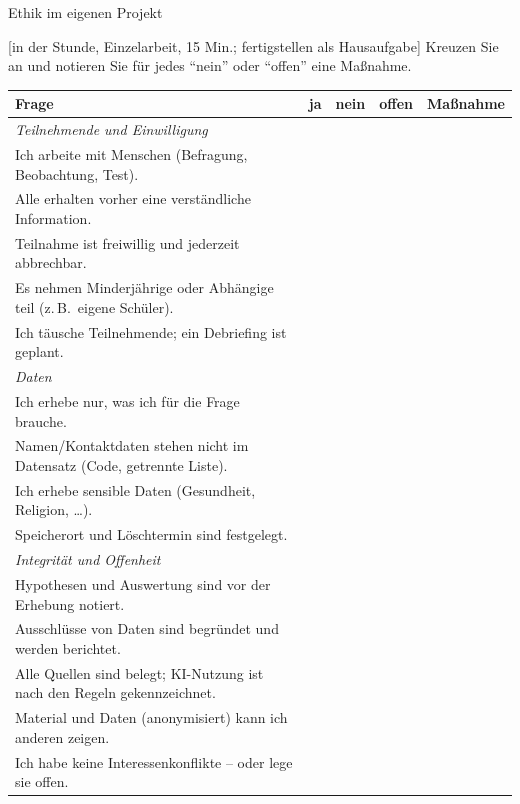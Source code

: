 \begin{uebungsblatt}{Ethik im eigenen Projekt}

[in der Stunde, Einzelarbeit, 15 Min.; fertigstellen als Hausaufgabe]
Kreuzen Sie an und notieren Sie für jedes \enquote{nein} oder
\enquote{offen} eine Maßnahme.

\begin{center}\small
\renewcommand{\arraystretch}{1.6}
\begin{tabular}{|p{}|c|c|c|p{}|}
\hline
\textbf{Frage} & \textbf{ja} & \textbf{nein} & \textbf{offen} & \textbf{Maßnahme} \\
\hline
\multicolumn{5}{|l|}{\textit{Teilnehmende und Einwilligung}} \\ \hline
Ich arbeite mit Menschen (Befragung, Beobachtung, Test). & & & & \\ \hline
Alle erhalten vorher eine verständliche Information. & & & & \\ \hline
Teilnahme ist freiwillig und jederzeit abbrechbar. & & & & \\ \hline
Es nehmen Minderjährige oder Abhängige teil (z.\,B.\ eigene Schüler). & & & & \\ \hline
Ich täusche Teilnehmende; ein Debriefing ist geplant. & & & & \\ \hline
\multicolumn{5}{|l|}{\textit{Daten}} \\ \hline
Ich erhebe nur, was ich für die Frage brauche. & & & & \\ \hline
Namen/Kontaktdaten stehen nicht im Datensatz (Code, getrennte Liste). & & & & \\ \hline
Ich erhebe sensible Daten (Gesundheit, Religion, \ldots). & & & & \\ \hline
Speicherort und Löschtermin sind festgelegt. & & & & \\ \hline
\multicolumn{5}{|l|}{\textit{Integrität und Offenheit}} \\ \hline
Hypothesen und Auswertung sind vor der Erhebung notiert. & & & & \\ \hline
Ausschlüsse von Daten sind begründet und werden berichtet. & & & & \\ \hline
Alle Quellen sind belegt; KI-Nutzung ist nach den Regeln gekennzeichnet. & & & & \\ \hline
Material und Daten (anonymisiert) kann ich anderen zeigen. & & & & \\ \hline
Ich habe keine Interessenkonflikte -- oder lege sie offen. & & & & \\ \hline
\end{tabular}
\end{center}


\end{uebungsblatt}
